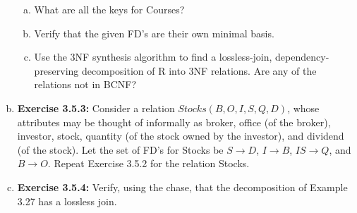 \documentclass[12pt]{article}
\begin{document}
\begin{enumerate}[a)]
    \begin{enumerate}[a)]
        \item What are all the keys for Courses?
        \item Verify that the given FD's are their own minimal basis.
        \item Use the 3NF synthesis algorithm to find a lossless-join, dependency-preserving decomposition of R into 3NF relations. Are any of the relations not in BCNF?
    \end{enumerate}

    \item \textbf{Exercise 3.5.3:} Consider a relation $Stocks(B, O, I, S, Q, D)$, whose attributes
    may be thought of informally as broker, office (of the broker), investor, stock,
    quantity (of the stock owned by the investor), and dividend (of the stock). Let
    the set of FD's for Stocks be $S \to D$, $I \to B$, $IS \to Q$, and $B \to O$. Repeat
    Exercise 3.5.2 for the relation Stocks.

    \item \textbf{Exercise 3.5.4:} Verify, using the chase, that the decomposition of Example
    3.27 has a lossless join.
\end{enumerate}
\end{document}
